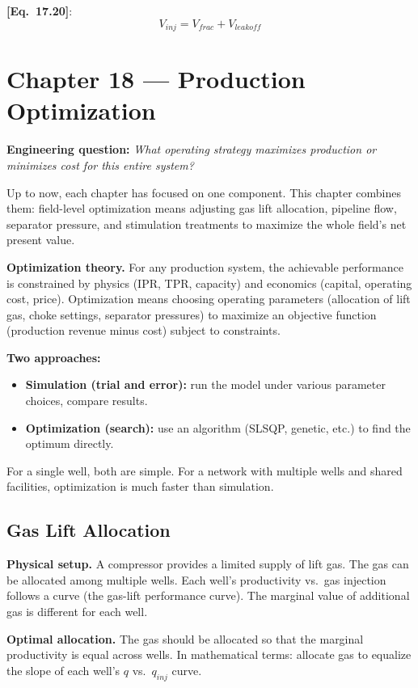 \documentclass[11pt,a4paper,openany]{book}
\newcommand{\eqrefbook}[1]{\textcolor{blue!60!black}{\textbf{[Eq.~#1]}}}
\begin{document}
\eqrefbook{17.20}:
\begin{equation}
  V_{inj} = V_{frac} + V_{leakoff}
\end{equation}

\chapter{Chapter 18 — Production Optimization}

\begin{purpose}
\textbf{Engineering question:} \emph{What operating strategy maximizes
production or minimizes cost for this entire system?}

Up to now, each chapter has focused on one component. This chapter
combines them: field-level optimization means adjusting gas lift
allocation, pipeline flow, separator pressure, and stimulation
treatments to maximize the whole field's net present value.
\end{purpose}

\begin{theory}
\textbf{Optimization theory.} For any production system, the achievable
performance is constrained by physics (IPR, TPR, capacity) and
economics (capital, operating cost, price). Optimization means
choosing operating parameters (allocation of lift gas, choke
settings, separator pressures) to maximize an objective function
(production revenue minus cost) subject to constraints.

\textbf{Two approaches:}
\begin{itemize}
  \item \textbf{Simulation (trial and error):} run the model under
        various parameter choices, compare results.
  \item \textbf{Optimization (search):} use an algorithm (SLSQP,
        genetic, etc.) to find the optimum directly.
\end{itemize}

For a single well, both are simple. For a network with multiple wells
and shared facilities, optimization is much faster than simulation.
\end{theory}

\section{Gas Lift Allocation}

\begin{theory}
\textbf{Physical setup.} A compressor provides a limited supply of
lift gas. The gas can be allocated among multiple wells. Each well's
productivity vs.\ gas injection follows a curve (the gas-lift
performance curve). The marginal value of additional gas is different
for each well.

\textbf{Optimal allocation.} The gas should be allocated so that the
marginal productivity is equal across wells. In mathematical terms:
allocate gas to equalize the slope of each well's $q$ vs.\ $q_{inj}$
curve.
\end{theory}
\end{document}
